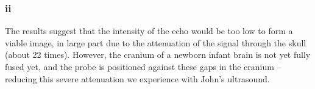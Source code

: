 \subsubsection*{ii}
The results suggest that the intensity of the echo would be too low to form a viable image, in large part due to the attenuation of the signal through the skull (about 22 times). However, the cranium of a newborn infant brain is not yet fully fused yet, and the probe is positioned against these gaps in the cranium -- reducing this severe attenuation we experience with John's ultrasound. 